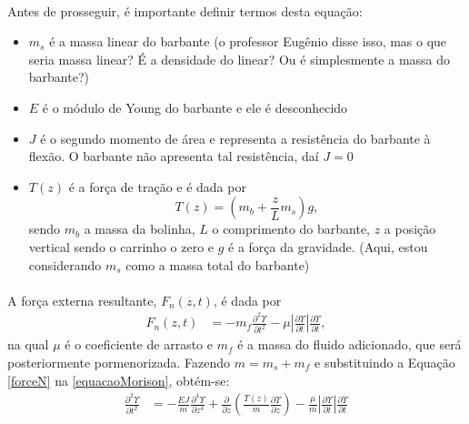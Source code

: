 \documentclass[a4paper,11pt]{scrartcl} %
\numberwithin{equation}{section} %
\numberwithin{figure}{section} %
\numberwithin{table}{section} %
\begin{document}
\paragraph{} Antes de prosseguir, é importante definir termos desta equação: \begin{itemize}
	\item $m_s$ é a massa linear do barbante (o professor Eugênio disse isso, mas o que seria massa linear? É a densidade do linear? Ou é simplesmente a massa do barbante?) %
	\item $E$ é o módulo de Young do barbante e ele é desconhecido
	\item $J$ é o segundo momento de área e representa a resistência do barbante à flexão. O barbante não apresenta tal resistência, daí $J=0$
	\item $T(z)$ é a força de tração e é dada por \[T(z) = \left(m_b+\frac{z}{L}m_s\right)g,\] sendo $m_b$ a massa da bolinha, $L$ o comprimento do barbante, $z$ a posição vertical sendo o carrinho o zero e $g$ é a força da gravidade. (Aqui, estou considerando $m_s$ como a massa total do barbante)
\end{itemize}

\paragraph{} A força externa resultante, $F_n(z,t)$, é dada por \begin{align}
	F_n(z,t) &= -m_f \frac{\partial^2 \Upsilon}{\partial t^2} - \mu \left|\frac{\partial \Upsilon}{\partial t}\right|\frac{\partial \Upsilon}{\partial t}\label{forceN},
\end{align} na qual $\mu$ é o coeficiente de arrasto e $m_f$ é a massa do fluido adicionado, que será posteriormente pormenorizada. Fazendo $m = m_s + m_f$ e substituindo a Equação \ref{forceN} na \ref{equacaoMorison}, obtém-se: \begin{align}
	\frac{\partial^2 \Upsilon}{\partial t^2} &= -\frac{EJ}{m}\frac{\partial^4 \Upsilon}{\partial z^4} + \frac{\partial}{\partial z}\left(\frac{T(z)}{m}\frac{\partial \Upsilon}{\partial z}\right) - \frac{\mu}{m}\left|\frac{\partial \Upsilon}{\partial t}\right|\frac{\partial \Upsilon}{\partial t}
\end{align}
\end{document}
